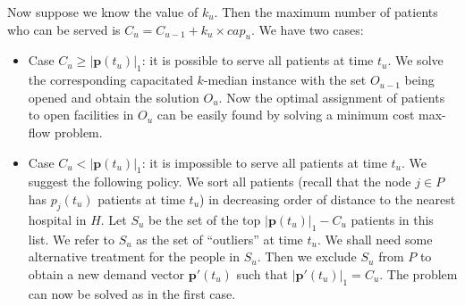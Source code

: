 Now suppose we know the value of $k_u$. Then the maximum number of patients who can be served is $C_u = C_{u-1} + k_u \times cap_u$. We have two cases:
\begin{itemize}
	\item Case $C_u \geq |\mathbf{p}(t_u)|_1$: it is possible to serve all patients at time $t_u$. We solve the corresponding capacitated $k$-median instance with the set $O_{u-1}$ being opened and obtain the solution $O_u$. Now the optimal assignment of patients to open facilities in $O_u$ can be easily found by solving a minimum cost max-flow problem.
	
	\item Case $C_u < |\mathbf{p}(t_u)|_1$: it is impossible to serve all patients at time $t_u$. We suggest the following policy. We sort all patients (recall that the node $j \in P$ has $p_j(t_u)$ patients at time $t_u$) in decreasing order of distance to the nearest hospital in $H$. Let $S_u$ be the set of the top $|\mathbf{p}(t_u)|_1 - C_u$ patients in this list. We refer to $S_u$ as the set of ``outliers'' at time $t_u$. We shall need some alternative treatment for the people in $S_u$. Then we exclude $S_u$ from $P$ to obtain a new demand vector $\mathbf{p}'(t_u)$ such that $|\mathbf{p}'(t_u)|_1 = C_u$. The problem can now be solved as in the first case.
	
\end{itemize}






